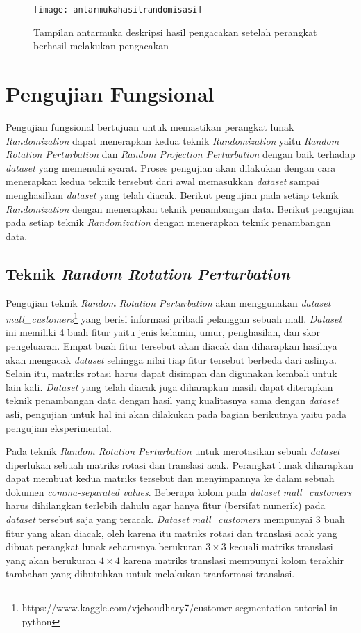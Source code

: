 \begin{figure}
	\centering
	\texttt{[image: antarmukahasilrandomisasi]}
	\caption{Tampilan antarmuka deskripsi hasil pengacakan setelah perangkat berhasil melakukan pengacakan}
	\label{fig:antarmukahasilrandomisasi}
\end{figure}

\section{Pengujian Fungsional}
\label{sec:pengujianfungsional}

Pengujian fungsional bertujuan untuk memastikan perangkat lunak \textit{Randomization} dapat menerapkan kedua teknik \textit{Randomization} yaitu \textit{Random Rotation Perturbation} dan \textit{Random Projection Perturbation} dengan baik terhadap \textit{dataset} yang memenuhi syarat. Proses pengujian akan dilakukan dengan cara menerapkan kedua teknik tersebut dari awal memasukkan \textit{dataset} sampai menghasilkan \textit{dataset} yang telah diacak. Berikut pengujian pada setiap teknik \textit{Randomization} dengan menerapkan teknik penambangan data. Berikut pengujian pada setiap teknik \textit{Randomization} dengan menerapkan teknik penambangan data.

\subsection{Teknik \textit{Random Rotation Perturbation}}
\label{subsec:rrp-fungsional}

Pengujian teknik \textit{Random Rotation Perturbation} akan menggunakan \textit{dataset} \textit{mall\_customers}\footnote{https://www.kaggle.com/vjchoudhary7/customer-segmentation-tutorial-in-python} yang berisi informasi pribadi pelanggan sebuah mall. \textit{Dataset} ini memiliki 4 buah fitur yaitu jenis kelamin, umur, penghasilan, dan skor pengeluaran. Empat buah fitur tersebut akan diacak dan diharapkan hasilnya akan mengacak \textit{dataset} sehingga nilai tiap fitur tersebut berbeda dari aslinya. Selain itu, matriks rotasi harus dapat disimpan dan digunakan kembali untuk lain kali. \textit{Dataset} yang telah diacak juga diharapkan masih dapat diterapkan teknik penambangan data dengan hasil yang kualitasnya sama dengan \textit{dataset} asli, pengujian untuk hal ini akan dilakukan pada bagian berikutnya yaitu pada pengujian eksperimental.

Pada teknik \textit{Random Rotation Perturbation} untuk merotasikan sebuah \textit{dataset} diperlukan sebuah matriks rotasi dan translasi acak. Perangkat lunak diharapkan dapat membuat kedua matriks tersebut dan menyimpannya ke dalam sebuah dokumen \textit{comma-separated values}. Beberapa kolom pada \textit{dataset} \textit{mall\_customers} harus dihilangkan terlebih dahulu agar hanya fitur (bersifat numerik) pada \textit{dataset} tersebut saja yang teracak. \textit{Dataset} \textit{mall\_customers} mempunyai 3 buah fitur yang akan diacak, oleh karena itu matriks rotasi dan translasi acak yang dibuat perangkat lunak seharusnya berukuran \(3\times3\) kecuali matriks translasi yang akan berukuran \(4\times4\) karena matriks translasi mempunyai kolom terakhir tambahan yang dibutuhkan untuk melakukan tranformasi translasi. 

